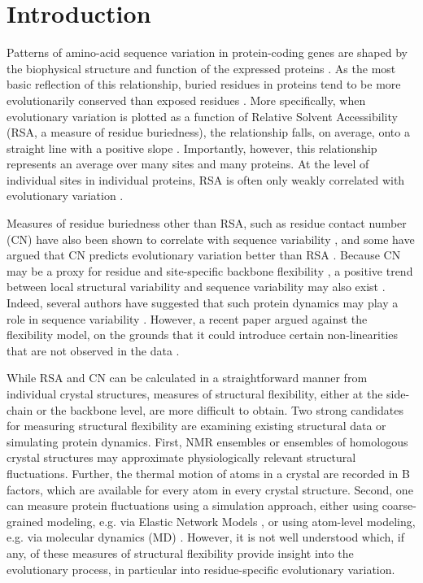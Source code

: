 \documentclass[smallextended]{svjour3}
\begin{document}
\section*{Introduction}

Patterns of amino-acid sequence variation in protein-coding genes are shaped by the biophysical structure and function of the expressed proteins
\citep{WilkeDrummond2010,Liberlesetal2012,MarshTeichmann2014}. As the most basic reflection of this relationship, buried residues in proteins tend to be more evolutionarily conserved than exposed residues
\citep{Overingtonetal1992,Goldmanetal1998,MirnyShakhnovich1999,Deanetal2002}. More specifically, when evolutionary variation is plotted as a function of Relative Solvent Accessibility (RSA, a measure of residue buriedness), the relationship falls, on average, onto a straight line with a positive slope \citep{FranzosaXia2009,Ramseyetal2011,FranzosaXia2012,Scherreretal2012}. Importantly, however, this relationship represents an average over many sites and many proteins. At the level of individual sites in individual proteins, RSA is often only weakly correlated with evolutionary variation \citep{MeyerWilke2013,Meyeretal2013,Yehetal2014}.

Measures of residue buriedness other than RSA, such as residue contact number (CN) have also been shown to correlate with sequence variability \citep{Liaoetal2005,FranzosaXia2009,Yehetal2014}, and some have argued that CN predicts evolutionary variation better than RSA \citep{Yehetal2014}. Because CN may be a proxy for residue and site-specific backbone flexibility \citep{Halle2002}, a positive trend between local structural variability and sequence variability may also exist \citep{Yehetal2014}. Indeed, several authors have suggested that such protein dynamics may play a role in sequence variability \citep{LiuBahar2012,NevinGereketal2013,MarshTeichmann2014}. However, a recent paper argued against the flexibility model, on the grounds that it could introduce certain non-linearities that are not observed in the data \citep{Huangetal2014}.

While RSA and CN can be calculated in a straightforward manner from individual crystal structures, measures of structural flexibility, either at the side-chain or the backbone level, are more difficult to obtain. Two strong candidates for measuring structural flexibility are examining existing structural data or simulating protein dynamics. First, NMR ensembles or ensembles of homologous crystal structures may approximate physiologically relevant structural fluctuations. Further, the thermal motion of atoms in a crystal are recorded in B factors, which are available for every atom in every crystal structure. Second, one can measure protein fluctuations using a simulation approach, either using coarse-grained modeling, e.g. via Elastic Network Models \citep{Sanejouand2013}, or using atom-level modeling, e.g. via molecular dynamics (MD) \citep{KarplusMcCammon2002}. However, it is not well understood which, if any, of these measures of structural flexibility provide insight into the evolutionary process, in particular into residue-specific evolutionary variation.
\end{document}
